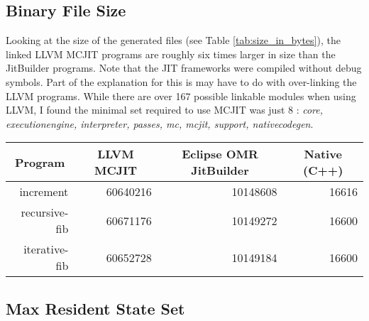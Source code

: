 \subsection{Binary File Size}
Looking at the size of the generated files (see Table \ref{tab:size_in_bytes}), the linked LLVM MCJIT programs are roughly six times larger in size than the JitBuilder programs.
Note that the JIT frameworks were compiled without debug symbols.
Part of the explanation for this is may have to do with over-linking the LLVM programs.
While there are over 167 possible linkable modules when using LLVM, I found the minimal set required to use MCJIT was just 8 : \textit{core, executionengine, interpreter, passes, mc, mcjit, support, nativecodegen}.

\begin{table*}[t]
  \begin{tabular}{|r|l|l|l|} 
  \hline
  \multicolumn{1}{|c|}{\textbf{Program}}
  & \multicolumn{1}{c|}{\textbf{LLVM MCJIT}}                      & \multicolumn{1}{c|}{\textbf{Eclipse OMR JitBuilder}}
  & \multicolumn{1}{c|}{\textbf{Native (C++)}}                    \\ \hline

  increment                               
  & \multicolumn{1}{r|}{\num{60640216}} %
  & \multicolumn{1}{r|}{\num{10148608}} %
  & \multicolumn{1}{r|}{\num{16616}}    %
  \\ \hline
  
  recursive-fib                           
  & \multicolumn{1}{r|}{\num{60671176}} %
  & \multicolumn{1}{r|}{\num{10149272}} %
  & \multicolumn{1}{r|}{\num{16600}}   %
  \\ \hline
  
  iterative-fib                           
  & \multicolumn{1}{r|}{\num{60652728}} %
  & \multicolumn{1}{r|}{\num{10149184}} %
  & \multicolumn{1}{r|}{\num{16600}}   %
  \\ \hline
  
\end{tabular}
  \caption{Total size in bytes of linked binary test programs.}
  \label{tab:size_in_bytes}
\end{table*}


\subsection{Max Resident State Set}


